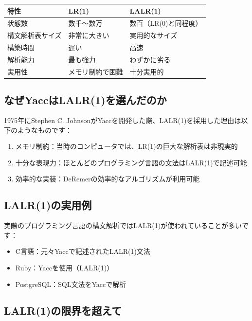 \begin{longtable}[]{@{}lll@{}}
\toprule
特性 & LR(1) & LALR(1)\tabularnewline
\midrule
\endhead
状態数 & 数千～数万 & 数百（LR(0)と同程度）\tabularnewline
構文解析表サイズ & 非常に大きい & 実用的なサイズ\tabularnewline
構築時間 & 遅い & 高速\tabularnewline
解析能力 & 最も強力 & わずかに劣る\tabularnewline
実用性 & メモリ制約で困難 & 十分実用的\tabularnewline
\bottomrule
\end{longtable}

\hypertarget{chapter5-ux306aux305cyaccux306flalr1ux3092ux9078ux3093ux3060ux306eux304b}{%
\subsection{なぜYaccはLALR(1)を選んだのか}\label{chapter5-ux306aux305cyaccux306flalr1ux3092ux9078ux3093ux3060ux306eux304b}}

1975年にStephen C.
JohnsonがYaccを開発した際、LALR(1)を採用した理由は以下のようなものです：

\begin{enumerate}
\def\labelenumi{\arabic{enumi}.}
\tightlist
\item
  メモリ制約：当時のコンピュータでは、LR(1)の巨大な解析表は非現実的
\item
  十分な表現力：ほとんどのプログラミング言語の文法はLALR(1)で記述可能
\item
  効率的な実装：DeRemerの効率的なアルゴリズムが利用可能
\end{enumerate}

\hypertarget{chapter5-lalr1ux306eux5b9fux7528ux4f8b}{%
\subsection{LALR(1)の実用例}\label{chapter5-lalr1ux306eux5b9fux7528ux4f8b}}

実際のプログラミング言語の構文解析ではLALR(1)が使われていることが多いです：

\begin{itemize}
\tightlist
\item
  C言語：元々Yaccで記述されたLALR(1)文法
\item
  Ruby：Yaccを使用（LALR(1)）
\item
  PostgreSQL：SQL文法をYaccで解析
\end{itemize}

\hypertarget{chapter5-lalr1ux306eux9650ux754cux3092ux8d85ux3048ux3066}{%
\subsection{LALR(1)の限界を超えて}\label{chapter5-lalr1ux306eux9650ux754cux3092ux8d85ux3048ux3066}}

